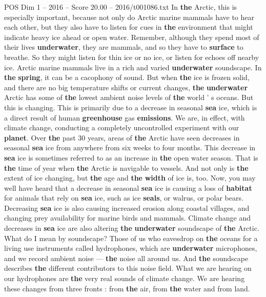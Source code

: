 \begin{textsample}{POS Dim 1 – 2016 – Score 20.00 – 2016/t001086.txt}
In \textbf{the} Arctic, this is especially important, because not only do Arctic marine mammals have to hear each other, but they also have to listen for cues in \textbf{the} environment that might indicate heavy ice ahead or open water.
Remember, although they spend most of their lives \textbf{underwater}, they are mammals, and so they have to \textbf{surface} to breathe.
So they might listen for thin ice or no ice, or listen for echoes off nearby ice.
Arctic marine mammals live in a rich and varied \textbf{underwater} soundscape.
In \textbf{the} \textbf{spring}, it can be a cacophony of sound.
But when \textbf{the} ice is frozen solid, and there are no big temperature shifts or current changes, \textbf{the} \textbf{underwater} Arctic has some of \textbf{the} lowest ambient noise levels of \textbf{the} world ' s oceans.
But this is changing.
This is primarily due to a decrease in seasonal \textbf{sea} ice, which is a direct result of human \textbf{greenhouse} gas \textbf{emissions}.
We are, in effect, with climate change, conducting a completely uncontrolled experiment with our \textbf{planet}.
Over \textbf{the} past 30 years, areas of \textbf{the} Arctic have seen decreases in seasonal \textbf{sea} ice from anywhere from six weeks to four months.
This decrease in \textbf{sea} ice is sometimes referred to as an increase in \textbf{the} open water season.
That is \textbf{the} time of year when \textbf{the} Arctic is navigable to vessels.
And not only is \textbf{the} extent of ice changing, but \textbf{the} age and \textbf{the} \textbf{width} of ice is, too.
Now, you may well have heard that a decrease in seasonal \textbf{sea} ice is causing a loss of \textbf{habitat} for animals that rely on \textbf{sea} ice, such as ice \textbf{seals}, or walrus, or polar bears.
Decreasing \textbf{sea} ice is also causing increased erosion along coastal villages, and changing prey availability for marine birds and mammals.
Climate change and decreases in \textbf{sea} ice are also altering \textbf{the} \textbf{underwater} soundscape of \textbf{the} Arctic.
What do I mean by soundscape?
Those of us who eavesdrop on \textbf{the} oceans for a living use instruments called hydrophones, which are \textbf{underwater} microphones, and we record ambient noise — \textbf{the} noise all around us.
And \textbf{the} soundscape describes \textbf{the} different contributors to this noise field.
What we are hearing on our hydrophones are \textbf{the} very real sounds of climate change.
We are hearing these changes from three fronts : from \textbf{the} air, from \textbf{the} water and from land.

\end{textsample}
